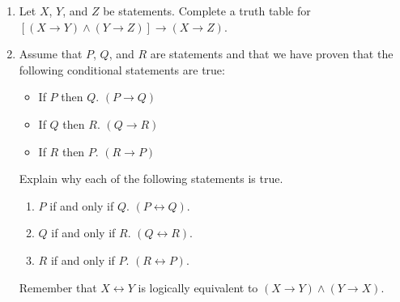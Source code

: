 \begin{previewactivity} \label{PA:provingequiv} \hfill

\begin{enumerate}
\item Let $X$, $Y$, and $Z$ be statements.  Complete a truth table for  \\$\left[ {\left( {X \to Y} \right) \wedge \left( {Y \to Z} \right)} \right] \to \left( {X \to Z} \right)$.

\item Assume that  $P$, $Q$, and  $R$  are statements and that we have proven that the following conditional statements are true:
\begin{multicols}{2}
\begin{itemize}
  \item If  $P$  then  $Q$.  $\left( {P \to Q} \right)$
  \item If  $Q$  then  $R$.  $\left( {Q \to R} \right)$
  \item If  $R$  then  $P$.  $\left( {R \to P} \right)$
\end{itemize}
\end{multicols}
Explain why each of the following statements is true.
\begin{multicols}{2}
\begin{enumerate}
  \item $P$  if and only if  $Q$.  $\left( {P \leftrightarrow Q} \right)$.
  \item $Q$  if and only if  $R$.	$\left( {Q \leftrightarrow R} \right)$.
  \item $R$  if and only if  $P$.  $\left( {R \leftrightarrow P} \right)$.
\end{enumerate}
\end{multicols}
Remember that  $X \leftrightarrow Y$  is logically equivalent to  
$\left( {X \to Y} \right) \wedge \left( {Y \to X} \right)$.

\end{enumerate}
\end{previewactivity}
\hbreak


\endinput
